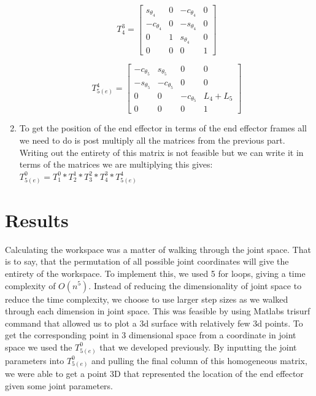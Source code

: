 \documentclass[12pt]{article}
\begin{document}
\begin{enumerate}
\begin{equation}	
	T^{3}_{4} = \begin{bmatrix}
	s_{\theta_{4}} & 0  & -c_{\theta_{4}}  &0\\
	-c_{\theta_{4}}  & 0  & -s_{\theta_{4}} & 0\\
	0 & 1 & s_{\theta_{4}}  & 0\\
	0 & 0 & 0 & 1
	\end{bmatrix}
\end{equation}

\begin{equation}	
	T^{4}_{5(e)} = \begin{bmatrix}
	-c_{\theta_{5}} & s_{\theta_{5}}   & 0  &0\\
	-s_{\theta_{5}} & -c_{\theta_{5}}  & 0 & 0\\
	0 & 0 & -c_{\theta_{5}} & L_{4}+L_{5}\\
	0 & 0 & 0 & 1
	\end{bmatrix}
\end{equation}

\item 

To get the position of the end effector in terms of the end effector frames all we need to do is post multiply all the matrices from the previous part. Writing out the entirety of this matrix is not feasible but we can write it in terms of the matrices we are multiplying this gives:
$T^{0}_{5(e)} =T^{0}_{1}*T^{1}_{2}*T^{2}_{3}*T^{3}_{4}*T^{4}_{5(e)}$
\end{enumerate}
 
\section{Results}
\par{Calculating the workspace was a matter of walking through the joint space. That is to say, that the permutation of all possible joint coordinates will give the entirety of the workspace. To implement this, we used 5 for loops, giving a time complexity of $O(n^{5})$. Instead of reducing the dimensionality of joint space to reduce the time complexity, we choose to use larger step sizes as we walked through each dimension in joint space. This was feasible by using Matlabs trisurf command that allowed us to plot a 3d surface with relatively few 3d points. To get the corresponding point in 3 dimensional space from a coordinate in joint space we used the $T^{0}_{5(e)} $ that we developed previously.  By inputting the joint parameters into $T^{0}_{5(e)}$ and pulling the final column of this homogeneous matrix, we were able to get a point 3D that represented the location of the end effector given some joint parameters.}
\end{document}
